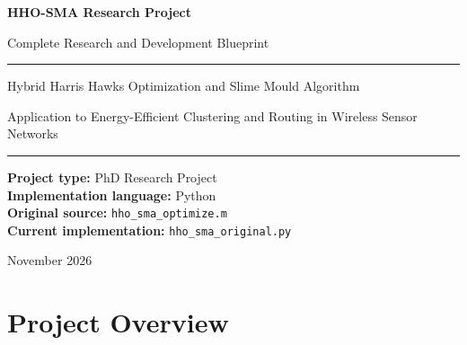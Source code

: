 \documentclass[12pt,a4paper]{report}
\begin{document}
\begin{titlepage}
    \centering

    \vspace*{2cm}

    {\Huge\bfseries HHO-SMA Research Project\par}

    \vspace{0.5cm}

    {\Large Complete Research and Development Blueprint\par}

    \vspace{1.5cm}

    \rule{\textwidth}{1pt}

    \vspace{0.5cm}

    {\Large
    Hybrid Harris Hawks Optimization and
    Slime Mould Algorithm
    \par}

    \vspace{0.5cm}

    {\large
    Application to Energy-Efficient Clustering
    and Routing in Wireless Sensor Networks
    \par}

    \vspace{0.5cm}

    \rule{\textwidth}{1pt}

    \vfill

    \begin{flushleft}
    \textbf{Project type:} PhD Research Project\\[0.3cm]
    \textbf{Implementation language:} Python\\[0.3cm]
    \textbf{Original source:} \texttt{hho\_sma\_optimize.m}\\[0.3cm]
    \textbf{Current implementation:}
    \texttt{hho\_sma\_original.py}
    \end{flushleft}

    \vfill

    {\large November 2026}

\end{titlepage}

\tableofcontents
\clearpage

\chapter{Project Overview}
\end{document}
